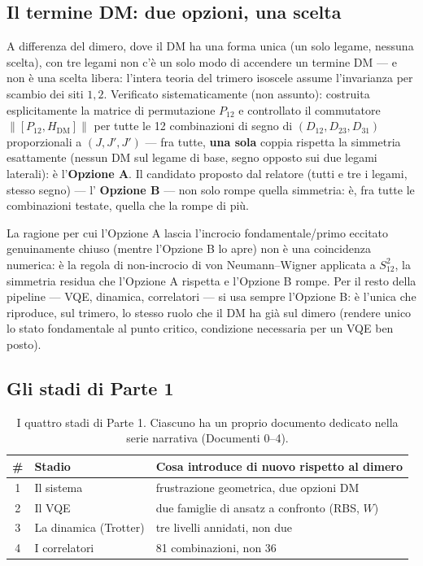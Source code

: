 \documentclass[11pt,a4paper]{article}
\begin{document}
\subsection{Il termine DM: due opzioni, una scelta}
\label{subsec:dm-parte1}

A differenza del dimero, dove il DM ha una forma unica (un solo legame,
nessuna scelta), con tre legami non c'è un solo modo di accendere un
termine DM --- e non è una scelta libera: l'intera teoria del trimero
isoscele assume l'invarianza per scambio dei siti $1,2$. Verificato
sistematicamente (non assunto): costruita esplicitamente la matrice di
permutazione $P_{12}$ e controllato il commutatore $\|[P_{12},H_\text{DM}]\|$
per tutte le 12 combinazioni di segno di $(D_{12},D_{23},D_{31})$
proporzionali a $(J,J',J')$ --- fra tutte, \textbf{una sola} coppia
rispetta la simmetria esattamente (nessun DM sul legame di base, segno
opposto sui due legami laterali): è l'\textbf{Opzione A}. Il candidato
proposto dal relatore (tutti e tre i legami, stesso segno) --- l'
\textbf{Opzione B} --- non solo rompe quella simmetria: è, fra tutte le
combinazioni testate, quella che la rompe di più.

La ragione per cui l'Opzione A lascia l'incrocio fondamentale/primo
eccitato genuinamente chiuso (mentre l'Opzione B lo apre) non è una
coincidenza numerica: è la regola di non-incrocio di von
Neumann--Wigner applicata a $S_{12}^2$, la simmetria residua che
l'Opzione A rispetta e l'Opzione B rompe. Per il resto della pipeline
--- VQE, dinamica, correlatori --- si usa sempre l'Opzione B: è l'unica
che riproduce, sul trimero, lo stesso ruolo che il DM ha già sul dimero
(rendere unico lo stato fondamentale al punto critico, condizione
necessaria per un VQE ben posto).

\subsection{Gli stadi di Parte 1}
\label{sec:stadi-parte1}

\begin{table}[htbp]
\centering
\begin{tabular}{@{}cll@{}}
\toprule
\# & Stadio & Cosa introduce di nuovo rispetto al dimero \\
\midrule
1 & Il sistema & frustrazione geometrica, due opzioni DM \\
2 & Il VQE & due famiglie di ansatz a confronto (RBS, $W$) \\
3 & La dinamica (Trotter) & tre livelli annidati, non due \\
4 & I correlatori & 81 combinazioni, non 36 \\
\bottomrule
\end{tabular}
\caption{I quattro stadi di Parte 1. Ciascuno ha un proprio documento
dedicato nella serie narrativa (Documenti 0--4).}
\end{table}
\FloatBarrier
\end{document}
